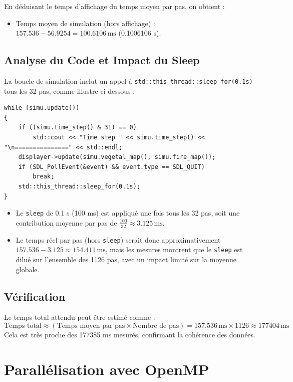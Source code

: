 \documentclass[a4paper,12pt]{article}
\begin{document}
En déduisant le temps d'affichage du temps moyen par pas, on obtient :
\begin{itemize}
    \item Temps moyen de simulation (hors affichage) : \( 157.536 - 56.9254 = 100.6106 \, \text{ms} \) (0.1006106 s).
\end{itemize}

\subsection{Analyse du Code et Impact du Sleep}
La boucle de simulation inclut un appel à \texttt{std::this\_thread::sleep\_for(0.1s)} tous les 32 pas, comme illustre 
ci-dessous :
\begin{lstlisting}
while (simu.update())
{
    if ((simu.time_step() & 31) == 0) 
        std::cout << "Time step " << simu.time_step() << "\n===============" << std::endl;
    displayer->update(simu.vegetal_map(), simu.fire_map());
    if (SDL_PollEvent(&event) && event.type == SDL_QUIT)
        break;
    std::this_thread::sleep_for(0.1s);
}
\end{lstlisting}
\begin{itemize}
    \item Le \texttt{sleep} de 0.1 s (100 ms) est appliqué une fois tous les 32 pas, soit une contribution moyenne par pas de \(\frac{100}{32} \approx 3.125 \, \text{ms}\).
    \item Le temps réel par pas (hors \texttt{sleep}) serait donc approximativement \( 157.536 - 3.125 \approx 154.411 \, \text{ms} \), mais les mesures montrent que le \texttt{sleep} est dilué sur l'ensemble des 1126 pas, avec un impact limité sur la moyenne globale.
\end{itemize}

\subsection{Vérification}
Le temps total attendu peut être estimé comme :
\[
\text{Temps total} \approx (\text{Temps moyen par pas} \times \text{Nombre de pas}) = 157.536 \, \text{ms} \times 1126 \approx 177404 \, \text{ms}
\]
Cela est très proche des 177385 ms mesurés, confirmant la cohérence des données.



\section{Parallélisation avec OpenMP}
\end{document}
